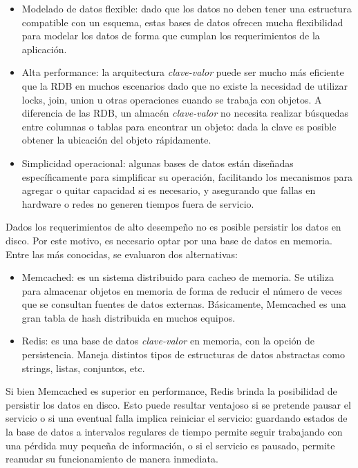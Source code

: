 \documentclass[a4paper,10pt, oneside]{article}
\begin{document}
\begin{itemize}
	\item Modelado de datos flexible: dado que los datos no deben tener una estructura compatible con un esquema, estas bases de datos ofrecen mucha flexibilidad para modelar los datos de forma que cumplan los requerimientos de la aplicación.
	\item Alta performance: la arquitectura \textit{clave-valor} puede ser mucho más eficiente que la RDB en muchos escenarios dado que no existe la necesidad de utilizar locks, join, union u otras operaciones cuando se trabaja con objetos. A diferencia de las RDB, un almacén \textit{clave-valor} no necesita realizar búsquedas entre columnas o tablas para encontrar un objeto: dada la clave es posible obtener la ubicación del objeto rápidamente.
	\item Simplicidad operacional: algunas bases de datos están diseñadas específicamente para simplificar su operación, facilitando los mecanismos para agregar o quitar capacidad si es necesario, y asegurando que fallas en hardware o redes no generen tiempos fuera de servicio.
\end{itemize}

Dados los requerimientos de alto desempeño no es posible persistir los datos en disco. Por este motivo, es necesario optar por una base de datos en memoria. Entre las más conocidas, se evaluaron dos alternativas:

\begin{itemize}
	\item Memcached: es un sistema distribuido para cacheo de memoria. Se utiliza para almacenar objetos en memoria de forma de reducir el número de veces que se consultan fuentes de datos externas. Básicamente, Memcached es una gran tabla de hash distribuida en muchos equipos.
	\item Redis: es una base de datos \textit{clave-valor} en memoria, con la opción de persistencia. Maneja distintos tipos de estructuras de datos abstractas como strings, listas, conjuntos, etc.
\end{itemize}

Si bien Memcached es superior en performance, Redis brinda la posibilidad de persistir los datos en disco. Esto puede resultar ventajoso si se pretende pausar el servicio o si una eventual falla implica reiniciar el servicio: guardando estados de la base de datos a intervalos regulares de tiempo permite seguir trabajando con una pérdida muy pequeña de información, o si el servicio es pausado, permite reanudar su funcionamiento de manera inmediata.
\end{document}
